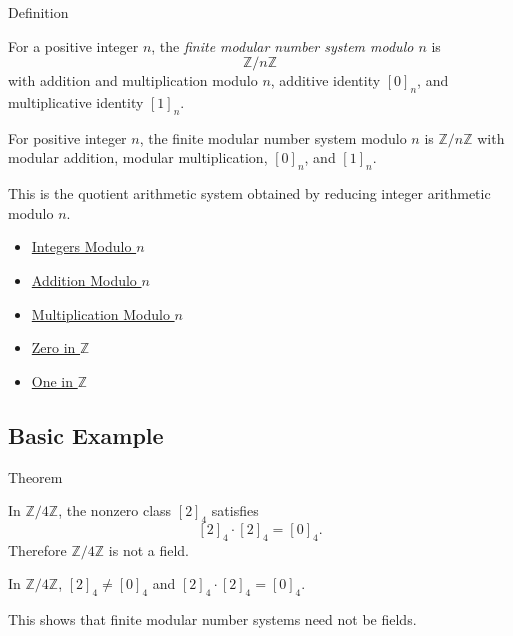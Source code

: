 \begin{definitionbox}{Definition}
\begin{definition}
\label{def:finite-modular-number-system}
For a positive integer \(n\), the \emph{finite modular number system modulo
\(n\)} is
\[
\mathbb{Z}/n\mathbb{Z}
\]
with addition and multiplication modulo \(n\), additive identity \([0]_n\),
and multiplicative identity \([1]_n\).
\end{definition}

\begin{remark*}
For positive integer \(n\), the finite modular number system modulo \(n\) is
\(\mathbb{Z}/n\mathbb{Z}\) with modular addition, modular multiplication,
\([0]_n\), and \([1]_n\).
\end{remark*}

\begin{remark*}[Interpretation]
This is the quotient arithmetic system obtained by reducing integer
arithmetic modulo \(n\).
\end{remark*}
\end{definitionbox}

\begin{dependencies}
\begin{itemize}
  \item \hyperref[def:integers-modulo-n]{Integers Modulo \(n\)}
  \item \hyperref[def:addition-modulo-n]{Addition Modulo \(n\)}
  \item \hyperref[def:multiplication-modulo-n]{Multiplication Modulo \(n\)}
  \item \hyperref[def:zero-in-z]{Zero in \(\mathbb{Z}\)}
  \item \hyperref[def:one-in-z]{One in \(\mathbb{Z}\)}
\end{itemize}
\end{dependencies}

\subsection*{Basic Example}

\begin{theorembox}{Theorem}
\begin{theorem}
\label{thm:z-mod-four-has-zero-divisors}
In \(\mathbb{Z}/4\mathbb{Z}\), the nonzero class \([2]_4\) satisfies
\[
[2]_4\cdot[2]_4=[0]_4.
\]
Therefore \(\mathbb{Z}/4\mathbb{Z}\) is not a field.
\end{theorem}

\begin{remark*}
In \(\mathbb{Z}/4\mathbb{Z}\), \([2]_4\neq[0]_4\) and
\([2]_4\cdot[2]_4=[0]_4\).
\end{remark*}

\begin{remark*}[Interpretation]
This shows that finite modular number systems need not be fields.
\end{remark*}
\end{theorembox}

